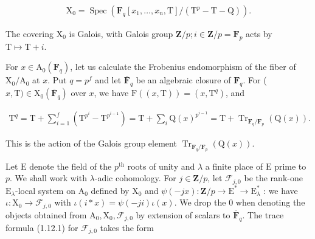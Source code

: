 \documentclass[10pt,leqno]{article}
\begin{document}
\begin{equation*}\begin{gathered}\mathrm{X}_{0} = \operatorname{Spec}(\mathbf{F}_{q}[x_{1},\ldots ,x_{n},\mathrm{T}]/(\mathrm{T}^{p}-\mathrm{T}-\mathrm{Q})).\end{gathered}\end{equation*}

\noindent The covering \(\mathrm{X}_{0}\) is Galois, with Galois group \(\mathbf{Z}/p; i \in  \mathbf{Z}/p = \mathbf{F}_{p}\) acts by \(\mathrm{T} \longmapsto  \mathrm{T}+i\).\par

\noindent For \(x \in  \mathrm{A}_{0}(\mathbf{F}_{q})\), let us calculate the Frobenius endomorphism of the fiber of \(\mathrm{X}_{0}/\mathrm{A}_{0}\) at \(x\). Put \(q = p^{f}\) and let \(\overline{\mathbf{F}}_{q}\) be an algebraic closure of \(\mathbf{F}_{q}\). For (\(x,\mathrm{T}) \in  \mathrm{X}_{0}(\overline{\mathbf{F}}_{q})\) over \(x\), we have \(\mathrm{F}((x,\mathrm{T})) = (x,\mathrm{T}^{q})\), and\par

\begin{equation*}\begin{gathered}\mathrm{T}^{q} = \mathrm{T} + \sum _{i=1}^{f} (\mathrm{T}^{p^{i}}-\mathrm{T}^{p^{i-1}}) = \mathrm{T} + \sum _{i} \mathrm{Q}(x)^{p^{i-1}} = \mathrm{T} + \operatorname{Tr}_{\mathbf{F}_{q}/\mathbf{F}_{p}}(\mathrm{Q}(x)).\end{gathered}\end{equation*}

\noindent This is the action of the Galois group element \(\operatorname{Tr}_{\mathbf{F}_{q}/\mathbf{F}_{p}}(\mathrm{Q}(x))\).\par

\noindent Let \(\mathrm{E}\) denote the field of the \(p^{\mathrm{th}}\) roots of unity and \(\lambda \) a finite place of \(\mathrm{E}\) prime to \(p\). We shall work with \(\lambda \)-adic cohomology. For \(j \in  \mathbf{Z}/p\), let \(\mathcal{F} _{j,0}\) be the rank-one \(\mathrm{E}_{\lambda }\)-local system on \(\mathrm{A}_{0}\) defined by \(\mathrm{X}_{0}\) and \(\psi (-jx) : \mathbf{Z}/p \longrightarrow  \mathrm{E}^{*} \longrightarrow  \mathrm{E}_{\lambda }^{*}\) : we have \(\iota  : \mathrm{X}_{0} \longrightarrow  \mathcal{F} _{j,0}\) with \(\iota (i*x) = \psi (-ji)\iota (x)\). We drop the 0 when denoting the objects obtained from \(\mathrm{A}_{0}, \mathrm{X}_{0}, \mathcal{F} _{j,0}\) by extension of scalars to \(\overline{\mathbf{F}}_{q}\). The trace formula (1.12.1) for \(\mathcal{F} _{j,0}\) takes the form\par
\end{document}
